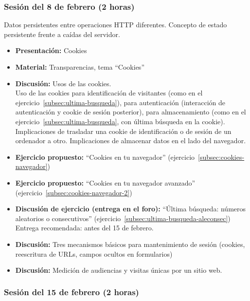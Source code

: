 \documentclass[a4paper,12pt]{article}
\begin{document}
\subsubsection{Sesión del 8 de febrero (2 horas)}

Datos persistentes entre operaciones HTTP diferentes. Concepto de estado persistente frente a caídas del servidor.

\begin{itemize}
\item \textbf{Presentación:} Cookies
\item \textbf{Material:} Transparencias, tema ``Cookies''
\item \textbf{Discusión:} Usos de las cookies. \\
  Uso de las cookies para identificación de visitantes (como en el ejercicio~\ref{subsec:ultima-busqueda}), para autenticación (interacción de autenticación y cookie de sesión posterior), para almacenamiento (como en el ejercicio~\ref{subsec:ultima-busqueda}, con última búsqueda en la cookie). Implicaciones de trasladar una cookie de identificación o de sesión de un ordenador a otro. Implicaciones de almacenar datos en el lado del navegador.
\item \textbf{Ejercicio propuesto:} ``Cookies en tu navegador'' (ejercicio~\ref{subsec:cookies-navegador}) \\
\item \textbf{Ejercicio propuesto:} ``Cookies en tu navegador avanzado'' (ejercicio~\ref{subsec:cookies-navegador-2}) \\
\item \textbf{Discusión de ejercicio (entrega en el foro):} ``Última búsqueda: números aleatorios o consecutivos'' (ejercicio~\ref{subsec:ultima-busqueda-aleconsec}) \\
 Entrega recomendada: antes del 15 de febrero.
\item \textbf{Discusión:} Tres mecanismos básicos para mantenimiento de sesión (cookies, reescritura de URLs, campos ocultos en formularios)
\item \textbf{Discusión:} Medición de audiencias y visitas únicas por un sitio web.
\end{itemize}

\subsubsection{Sesión del 15 de febrero (2 horas)}
\end{document}
